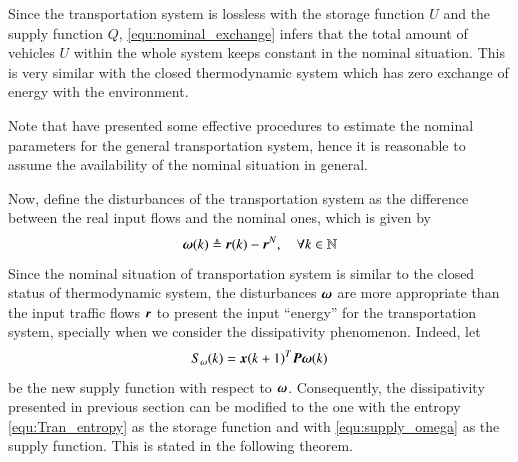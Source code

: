 \documentclass[preprint,authoryear,12pt]{elsarticle}
\renewcommand{\vec}[1]{\mbox{\boldmath$#1$}}
\newcommand{\mat}[1]{\mbox{\boldmath$#1$}}
\begin{document}
Since the transportation system is lossless with the storage function $U$ and the supply function $Q$, \eqref{equ:nominal_exchange} infers that the total amount of vehicles $U$ within the whole system keeps constant in the nominal situation. This is very similar with the closed thermodynamic system which has zero exchange of energy with the environment.

Note that \citet{de_oliveira_multi-agent_2010} have presented some effective procedures to estimate the nominal parameters for the general transportation system, hence it is reasonable to assume the availability of the nominal situation in general.

Now, define the disturbances of the transportation system as the difference between the real input flows and the nominal ones, which is given by
\begin{equation}
\vec{\omega}(k)\triangleq\vec{r}(k)-\vec{r}^N, \quad \forall
k\in\mathbb{N}
\end{equation}
Since the nominal situation of transportation system is similar to the closed status of thermodynamic system, the disturbances $\vec{\omega}$ are more appropriate than the input traffic flows $\vec{r}$ to present the input ``energy'' for the transportation system, specially when we consider the dissipativity phenomenon. Indeed, let
\begin{equation}\label{equ:supply_omega}
  S_\omega(k) = \vec{x}(k+1)^T \mat{P} \vec{\omega}(k)
\end{equation}
be the new supply function with respect to $\vec{\omega}$. Consequently, the dissipativity presented in previous section can be modified to the one with the entropy \eqref{equ:Tran_entropy} as the storage function and with \eqref{equ:supply_omega} as the supply function. This is stated in the following theorem.
\end{document}

